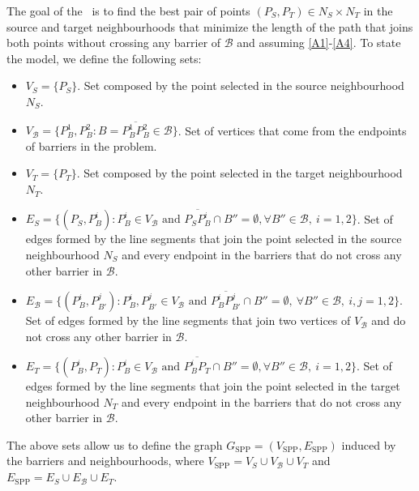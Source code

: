 \documentclass[a4paper,  review, authoryear, 1p.]{elsarticle}
\newcommand{\SPPN}{{\sf{H-SPPN}\xspace }}
\newcommand{\B}{{\mathcal B}}
\newcommand{\VB}{{V^{}_{\mathcal B}}}
\newcommand{\EB}{{E^{}_{\mathcal B}}}
\newcommand{\VS}{{V^{}_{S}}}
\newcommand{\ES}{{E^{}_{S}}}
\newcommand{\VT}{{V^{}_{T}}}
\newcommand{\ET}{{E^{}_{T}}}
\newcommand{\GSPP}{{G_{\text{SPP}}}}
\newcommand{\VSPP}{{V_{\text{SPP}}}}
\newcommand{\ESPP}{{E_{\text{SPP}}}}
\newcommand{\CV}[1]{{\color{atomictangerine}#1}}
\begin{document}
		The goal of the \SPPN \ is to find the best pair of points $(P_{S}, P_{T})\in N_S\times N_T$ in the source and target neighbourhoods that minimize the length of the path that joins both points without crossing any barrier of $\mathcal B$ and assuming \ref{A1}-\ref{A4}. To state the model,  we define the following sets:
		\begin{itemize}
			\item $\VS=\{P_S\}$. Set composed by the point selected in the source neighbourhood $N_S$.
			\item $\VB=\{P^1_B, P^2_B:B=\overline{P^1_B P^2_B}\in \mathcal B\}$. Set of vertices that come from the endpoints of barriers in the problem.
			\item $\VT=\{P^{}_T\}$. Set composed by the point selected in the target neighbourhood $N_T$.
			\item $\ES=\{(P_S, P^i_{B}):P^i_B\in V_\B\text{ and } \overline{P_SP^i_B}\cap B''=\emptyset,\forall B''\in\B,\:i=1,2\}$. Set of edges formed by the line segments that join the point selected in the source neighbourhood $N_S$ and every endpoint in the barriers that do not cross any other barrier in $\B$.
			\item $\EB=\{(P^{i}_B, P^{j}_{B'}):P^i_B, P^j_{B'}\in \VB \text{ and } \overline{P^i_B P^j_{B'}}\cap B''=\emptyset,\:\forall B''\in\mathcal B,\:i, j=1,2\}$. Set of edges formed by the line segments that join two vertices of $V_{\mathcal B}$ and do not cross any other barrier in $\B$.
			\item $\ET=\{(P^i_{B}, P^{}_T):P^i_B\in V_\B\text{ and } \overline{P^i_BP^{}_T}\cap B''=\emptyset,\forall B''\in\B,\:i=1,2\}$. Set of edges formed by the line segments that join the point selected in the target neighbourhood $N_T$ and every endpoint in the barriers that do not cross any other barrier in $\B$.
		\end{itemize} 
		
		The above sets allow us to define the graph $\GSPP= (\VSPP, \ESPP)$ induced by the barriers and neighbourhoods, where $\VSPP=\VS\cup \VB\cup\VT$ and $\ESPP=\ES\cup\EB \cup\ET$. 
		
\end{document}
